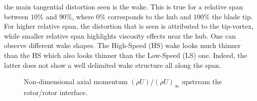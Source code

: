 the main tangential distortion seen is the wake. 
This is true for 
a relative span between $10\%$ and $90\%$, where $0\%$ corresponds
to the hub and $100\%$ the blade tip. 
For higher relative span, the distortion that is seen
is attributed to the tip-vortex, while smaller
relative span highlights viscosity effects near the hub.
One can observe different wake shapes. The High-Speed (HS) \aipx wake looks much
thinner than the HS \mockup which also looks
thinner than the Low-Speed (LS) one. Indeed, the latter does not show a
well delimited wake structure all along the span.
\begin{figure}[htbp]
  \centering
  \caption{Non-dimensional axial momentum $(\rho U)/(\rho U)_\infty$ 
  upstream the rotor/rotor interface.}
  \label{fig:crorroxvmap}
\end{figure}

